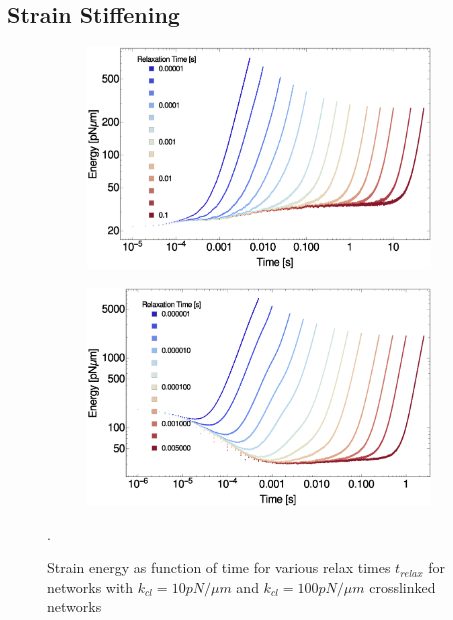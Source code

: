 \documentclass[12pt]{article}
\begin{document}
\subsection{Strain Stiffening} \label{strain_supp} 
\begin{figure}[H] 
  \begin{subfigure}{0.35\textwidth}
    \centering
    \includegraphics[width=\textwidth]{figs/elasticity/eng_vs_t_k10.eps}
    \caption{\label{fig:tRelax10}}
  \end{subfigure}
  \begin{subfigure}{0.35\textwidth}
    \centering
    \includegraphics[width=\textwidth]{figs/elasticity/eng_vs_t_k100.eps}
    \caption{\label{fig:tRelax100}}
  \end{subfigure}
  \label{fig:tRelax}
  \caption{Strain energy as function of time for various relax times $t_{relax}$ for networks with 
   $k_{cl}=10pN/\mu m$ and $k_{cl}=100pN/\mu m$  
crosslinked networks}.
\end{figure}
\end{document}
